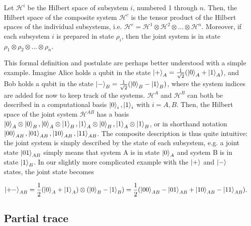 \begin{postulate} \label{pos:composite}
    Let $\mathcal{H}^i$ be the Hilbert space of subsystem $i$, numbered 1 through $n$. Then, the Hilbert space of the composite system $\mathcal{H}^c$ is the tensor product of the Hilbert spaces of the individual subsystems, i.e. $\mathcal{H}^c = \mathcal{H}^1 \otimes \mathcal{H}^2 \otimes \dots \otimes \mathcal{H}^n$. Moreover, if each subsystem $i$ is prepared in state $\rho_i$, then the joint system is in state $\rho_1 \otimes \rho_2 \otimes \dots \otimes \rho_n$.
\end{postulate}

This formal definition and postulate are perhaps better understood with a simple example. Imagine Alice holds a qubit in the state $\ket{+}_A = \frac{1}{\sqrt{2}}(\ket{0}_A + \ket{1}_A)$, and Bob holds a qubit in the state $\ket{-}_B = \frac{1}{\sqrt{2}}(\ket{0}_B - \ket{1}_B)$, where the system indices are added for now to keep track of the systems. $\mathcal{H}^A$ and $\mathcal{H}^B$ can both be described in a computational basis $\ket{0}_i, \ket{1}_i$ with $i = A, B$. Then, the Hilbert space of the joint system $\mathcal{H}^{AB}$ has a basis $\ket{0}_A \otimes \ket{0}_B, \ket{0}_A \otimes \ket{1}_B, \ket{1}_A \otimes \ket{0}_B, \ket{1}_A \otimes \ket{1}_B$, or in shorthand notation $\ket{00}_{AB}, \ket{01}_{AB}, \ket{10}_{AB}, \ket{11}_{AB}$. The composite description is thus quite intuitive: the joint system is simply described by the state of each subsystem, e.g. a joint state $\ket{01}_{AB}$ simply means that system A is in state $\ket{0}_A$ and system B is in state $\ket{1}_B$. In our slightly more complicated example with the $\ket{+}$ and $\ket{-}$ states, the joint state becomes

\begin{equation}
    \ket{+-}_{AB} = \frac{1}{2}(\ket{0}_A + \ket{1}_A) \otimes (\ket{0}_B - \ket{1}_B) = \frac{1}{2}(\ket{00}_{AB} - \ket{01}_{AB} + \ket{10}_{AB} - \ket{11}_{AB}).
\end{equation}

\subsection{Partial trace} \label{sec:partial_trace}

